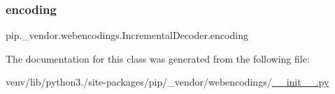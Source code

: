 \subsubsection{\texorpdfstring{encoding}{encoding}}
{\footnotesize\ttfamily pip.\+\_\+vendor.\+webencodings.\+Incremental\+Decoder.\+encoding}



The documentation for this class was generated from the following file\+:\begin{DoxyCompactItemize}
\item 
venv/lib/python3./site-\/packages/pip/\+\_\+vendor/webencodings/\hyperlink{venv_2lib_2python3_89_2site-packages_2pip_2__vendor_2webencodings_2____init_____8py}{\+\_\+\+\_\+init\+\_\+\+\_\+.\+py}\end{DoxyCompactItemize}
